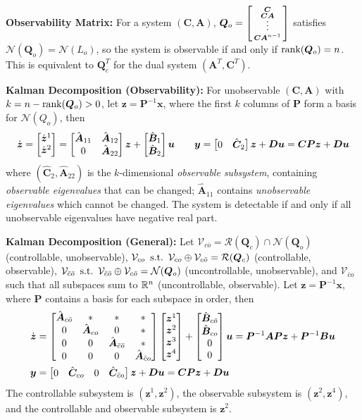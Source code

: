 \documentclass[twocolumn, 8pt]{extarticle}
\newcommand{\newvdots}{\vphantom{\int\limits^x}\smash[t]{\vdots}}
\begin{document}
\textbf{Observability Matrix:} For a system \((\bm C, \bm A)\),
\(\bm Q_o = \cvec[bsmall]{\bm C}{\bm C\bm A}{\newvdots}{\bm C\bm A^{n - 1}}\) satisfies
\(\mathcal N(\bm Q_o) = \mathcal N(L_o)\), so the system is observable if and only if
\(\operatorname{rank}(\bm Q_o) = n\).
This is equivalent to \(\bm Q_c^T\) for the dual system \((\bm A^T, \bm C^T)\).

\textbf{Kalman Decomposition (Observability):} For unobservable \((\bm C, \bm A)\) with \(k = n - \operatorname{rank}(\bm Q_o) > 0\), let
\(\bm z = \bm P^{-1}\bm x\), where the first \(k\) columns of \(\bm P\) form a basis for \(\mathcal N(Q_o)\), then
\[\dot{\bm z} = \cvec{\dot{\bm z}^1}{\dot{\bm z}^2} = \mattwo{\hat{\bm A}_{11}}{\hat{\bm A}_{12}}{0}{\hat{\bm A}_{22}}\bm z + \cvec{\hat{\bm B}_1}{\hat{\bm B}_2}\bm u
\qquad\bm y = \rvec{0}{\hat{\bm C}_2}\bm z + \bm D\bm u = \bm C\bm P\bm z + \bm D\bm u\]
where \((\hat{\bm C}_2, \hat{\bm A}_{22})\) is the
\(k\)-dimensional \textit{observable subsystem}, containing \textit{observable eigenvalues} that can be changed;
\(\hat{\bm A}_{11}\) contains \textit{unobservable eigenvalues} which cannot be changed. The system is detectable if
and only if all unobservable eigenvalues have negative real part.

\textbf{Kalman Decomposition (General):} Let \(\mathcal V_{c\bar o} = \mathcal R(\bm Q_c) \cap \mathcal N(\bm Q_o)\)
(controllable, unobservable), \(\mathcal V_{co} \enspace\mathrm{s.t.}\enspace \mathcal V_{co} \oplus \mathcal V_{c\bar o} = \mathcal R(\bm Q_c)\)
(controllable, observable), \(\mathcal V_{\bar c\bar o} \enspace\mathrm{s.t.}\enspace \mathcal V_{\bar c\bar o} \oplus \mathcal V_{c\bar o} = \mathcal N(\bm Q_o)\)
(uncontrollable, unobservable), and \(\mathcal V_{\bar co}\) such that all subspaces sum to \(\mathbb{R}^n\)
(uncontrollable, observable).
Let \(\bm z = \bm P^{-1}\bm x\), where \(\bm P\) contains a basis for each subspace in order, then
\begingroup
\setlength{\arraycolsep}{2pt}
\begin{align*}
    \dot{\bm z} &= \mat{\mrow{\hat{\bm A}_{c\bar o}}{*}{*}{*}\mrow{0}{\hat{\bm A}_{co}}{0}{*}\mrow{0}{0}{\hat{\bm A}_{\bar c\bar o}}{*}\mrow{0}{0}{0}{\hat{\bm A}_{\bar co}}}\cvec{\bm z^1}{\bm z^2}{\bm z^3}{\bm z^4} + \cvec{\hat{\bm B}_{c\bar o}}{\hat{\bm B}_{co}}{0}{0}\bm u = \bm P^{-1}\bm A\bm P\bm z + \bm P^{-1}\bm B\bm u \\
    \bm y &= \rvec{0}{\hat{\bm C}_{co}}{0}{\hat{\bm C}_{\bar co}}\bm z + \bm D\bm u = \bm C\bm P\bm z + \bm D\bm u
\end{align*}
\endgroup
The controllable subsystem is \((\bm z^1, \bm z^2)\), the observable subsystem is \((\bm z^2, \bm z^4)\),
and the controllable and observable subsystem is \(\bm z^2\).
\end{document}
